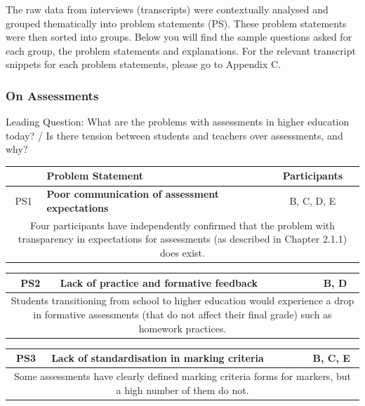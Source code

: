 The raw data from interviews (transcripts) were contextually analysed and grouped thematically into problem statements (PS).
These problem statements were then sorted into groups. Below you will find the sample questions asked for each group,
the problem statements and explanations.
For the relevant transcript snippets for each problem statements, please go to Appendix C.

\subsubsection{On Assessments}

Leading Question: What are the problems with assessments in higher education today? /
Is there tension between students and teachers over assessments, and why?

\begin{table}[!ht]
	\begin{tabularx}{\textwidth}{|c|X|c|}
		\hline
		    & Problem Statement                                      & Participants \\
		\hline
		PS1 & \textbf{Poor communication of assessment expectations} & B, C, D, E   \\
		\hline
		\multicolumn{3}{|X|}{Four participants have independently confirmed that the problem with transparency in expectations for
			assessments (as described in Chapter 2.1.1) does exist.}                    \\
		\hline
	\end{tabularx}
\end{table}
\begin{table}[!ht]
	\begin{tabularx}{\textwidth}{|c|X|c|}
		\hline
		PS2 & \textbf{Lack of practice and formative feedback} & B, D       \\
		\hline
		\multicolumn{3}{|X|}{Students transitioning from school to higher education would experience a drop in formative assessments
			(that do not affect their final grade) such as homework practices.} \\
		\hline
	\end{tabularx}
\end{table}
\begin{table}[!ht]
	\begin{tabularx}{\textwidth}{|c|X|c|}
		\hline
		PS3 & \textbf{Lack of standardisation in marking criteria} & B, C, E \\
		\hline
		\multicolumn{3}{|X|}{Some assessments have clearly defined marking criteria forms for markers, but a high
			number of them do not.}                                              \\
		\hline
	\end{tabularx}
\end{table}
